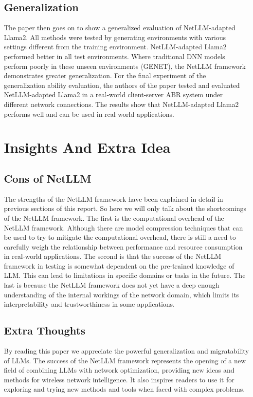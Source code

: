 \documentclass[twocolumn]{article}
\begin{document}
\subsection{Generalization}
The paper then goes on to show a generalized evaluation of NetLLM-adapted Llama2. All methods were tested by generating environments with various settings different from the training environment. NetLLM-adapted Llama2 performed better in all test environments. Where traditional DNN models perform poorly in these unseen environments (GENET), the NetLLM framework demonstrates greater generalization. For the final experiment of the generalization ability evaluation, the authors of the paper tested and evaluated NetLLM-adapted Llama2 in a real-world client-server ABR system under different network connections. The results show that NetLLM-adapted Llama2 performs well and can be used in real-world applications.

\section{Insights And Extra Idea}

\subsection{Cons of NetLLM}
The strengths of the NetLLM framework have been explained in detail in previous sections of this report. So here we will only talk about the shortcomings of the NetLLM framework. The first is the computational overhead of the NetLLM framework. Although there are model compression techniques that can be used to try to mitigate the computational overhead, there is still a need to carefully weigh the relationship between performance and resource consumption in real-world applications. The second is that the success of the NetLLM framework in testing is somewhat dependent on the pre-trained knowledge of LLM. This can lead to limitations in specific domains or tasks in the future. The last is because the NetLLM framework does not yet have a deep enough understanding of the internal workings of the network domain, which limits its interpretability and trustworthiness in some applications.

\subsection{Extra Thoughts}
By reading this paper we appreciate the powerful generalization and migratability of LLMs. The success of the NetLLM framework represents the opening of a new field of combining LLMs with network optimization, providing new ideas and methods for wireless network intelligence. It also inspires readers to use it for exploring and trying new methods and tools when faced with complex problems.
\end{document}
